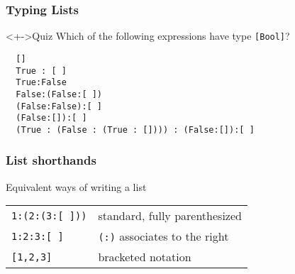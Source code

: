 \documentclass{beamer}
\begin{document}
\begin{frame}[fragile]
  \frametitle{Typing Lists}
\begin{alertblock}<+->{Quiz}
    Which of the following expressions have type \lstinline{[Bool]}?
\begin{lstlisting}
  []
  True : [ ]
  True:False
  False:(False:[ ])
  (False:False):[ ]
  (False:[]):[ ]
  (True : (False : (True : []))) : (False:[]):[ ]
\end{lstlisting}
  \end{alertblock}
\end{frame}
\begin{frame}
  \frametitle{List shorthands}
  \begin{block}{Equivalent ways of writing a list}
    \begin{flushleft}
      \begin{tabular}{l@{\qquad---\qquad}l}
        \lstinline{1:(2:(3:[ ]))}& standard, fully parenthesized\\
        \lstinline{1:2:3:[ ]} & \lstinline{(:)} associates to the right\\
        \lstinline{[1,2,3]} &  bracketed notation
      \end{tabular}
    \end{flushleft}
  \end{block}
\end{frame}
\end{document}
